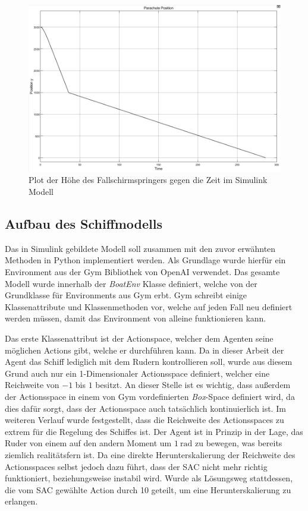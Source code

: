 \documentclass[]{iat}
\begin{document}
\begin{figure}[H]
    \includegraphics[width=\textwidth]{graphics/simulink_parachute_s_plot.png}
    \centering
    \caption{Plot der Höhe des Fallschirmspringers gegen die Zeit im Simulink Modell}
    \label{abb:simulink_parachute_s_plot}
\end{figure}

\subsection{Aufbau des Schiffmodells} \label{sec:aufbau_schiffsmodell}
Das in Simulink gebildete Modell soll zusammen mit den zuvor erwähnten Methoden in Python implementiert werden. Als Grundlage wurde hierfür ein Environment aus der Gym Bibliothek von OpenAI verwendet. Das gesamte Modell wurde innerhalb der \textit{BoatEnv} Klasse definiert, welche von der Grundklasse für Environments aus Gym erbt. Gym schreibt einige Klassenattribute und Klassenmethoden vor, welche auf jeden Fall neu definiert werden müssen, damit das Environment von alleine funktionieren kann.

Das erste Klassenattribut ist der Actionspace, welcher dem Agenten seine möglichen Actions gibt, welche er durchführen kann. Da in dieser Arbeit der Agent das Schiff lediglich mit dem Rudern kontrollieren soll, wurde aus diesem Grund auch nur ein 1-Dimensionaler Actionsspace definiert, welcher eine Reichweite von $-1$ bis $1$ besitzt. An dieser Stelle ist es wichtig, dass außerdem der Actionsspace in einem von Gym vordefinierten \textit{Box}-Space definiert wird, da dies dafür sorgt, dass der Actionsspace auch tatsächlich kontinuierlich ist. Im weiteren Verlauf wurde festgestellt, dass die Reichweite des Actionsspaces zu extrem für die Regelung des Schiffes ist. Der Agent ist in Prinzip in der Lage, das Ruder von einem auf den andern Moment um $\SI{1}{\radian}$ zu bewegen, was bereits ziemlich realitätsfern ist. Da eine direkte Herunterskalierung der Reichweite des Actionsspaces selbst jedoch dazu führt, dass der SAC nicht mehr richtig funktioniert, beziehungsweise instabil wird. Wurde als Lösungsweg stattdessen, die vom SAC gewählte Action durch 10 geteilt, um eine Herunterskalierung zu erlangen.
\end{document}
